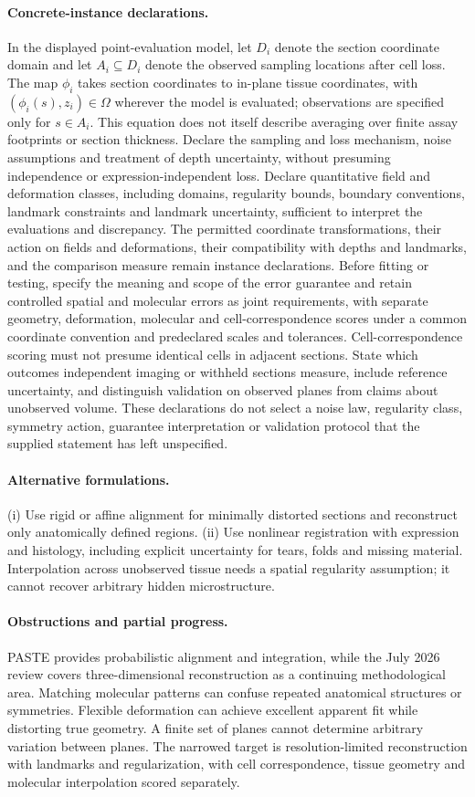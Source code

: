 \documentclass[11pt]{article}
\begin{document}
\paragraph{Concrete-instance declarations.} In the displayed point-evaluation model, let $D_i$ denote the section coordinate domain and let $A_i\subseteq D_i$ denote the observed sampling locations after cell loss. The map $\phi_i$ takes section coordinates to in-plane tissue coordinates, with $(\phi_i(s),z_i)\in\Omega$ wherever the model is evaluated; observations are specified only for $s\in A_i$. This equation does not itself describe averaging over finite assay footprints or section thickness. Declare the sampling and loss mechanism, noise assumptions and treatment of depth uncertainty, without presuming independence or expression-independent loss. Declare quantitative field and deformation classes, including domains, regularity bounds, boundary conventions, landmark constraints and landmark uncertainty, sufficient to interpret the evaluations and discrepancy. The permitted coordinate transformations, their action on fields and deformations, their compatibility with depths and landmarks, and the comparison measure remain instance declarations. Before fitting or testing, specify the meaning and scope of the error guarantee and retain controlled spatial and molecular errors as joint requirements, with separate geometry, deformation, molecular and cell-correspondence scores under a common coordinate convention and predeclared scales and tolerances. Cell-correspondence scoring must not presume identical cells in adjacent sections. State which outcomes independent imaging or withheld sections measure, include reference uncertainty, and distinguish validation on observed planes from claims about unobserved volume. These declarations do not select a noise law, regularity class, symmetry action, guarantee interpretation or validation protocol that the supplied statement has left unspecified.

\paragraph{Alternative formulations.} (i) Use rigid or affine alignment for minimally distorted sections and reconstruct only anatomically defined regions. (ii) Use nonlinear registration with expression and histology, including explicit uncertainty for tears, folds and missing material. Interpolation across unobserved tissue needs a spatial regularity assumption; it cannot recover arbitrary hidden microstructure.
\paragraph{Obstructions and partial progress.} PASTE provides probabilistic alignment and integration, while the July 2026 review covers three-dimensional reconstruction as a continuing methodological area. Matching molecular patterns can confuse repeated anatomical structures or symmetries. Flexible deformation can achieve excellent apparent fit while distorting true geometry. A finite set of planes cannot determine arbitrary variation between planes. The narrowed target is resolution-limited reconstruction with landmarks and regularization, with cell correspondence, tissue geometry and molecular interpolation scored separately.
\end{document}
